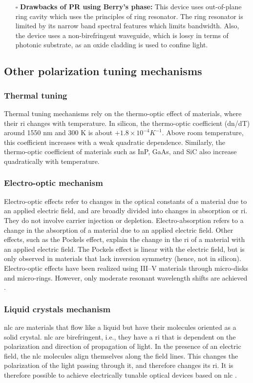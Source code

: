 \documentclass[../report.tex]{subfiles}
\begin{document}
\begin{itemize}[leftmargin=*]
		\item[$\square$] \textbf{Drawbacks of PR using Berry's phase:}
		This device uses out-of-plane ring cavity which uses the principles of ring resonator. The ring resonator is limited by its narrow band spectral features which limits bandwidth. Also, the device uses a non-birefringent waveguide, which is lossy in terms of photonic substrate, as an oxide cladding is used to confine light. 	
	\end{itemize}
	
\subsection{Other polarization tuning mechanisms}

\subsubsection{Thermal tuning} Thermal tuning mechanisms rely on the thermo-optic effect of materials, where their \gls{ri} changes with temperature. In silicon, the thermo-optic coefficient (dn/dT) around 1550 nm and 300 K is about $+1.8 \times 10^{-4} K^{-1}$. Above room temperature, this coefficient increases with a weak quadratic dependence. Similarly, the thermo-optic coefficient of materials such as InP, GaAs, and SiC also increase quadratically with temperature.

\subsubsection{Electro-optic mechanism}
Electro-optic effects refer to changes in the optical constants of a material due to an applied electric field, and are broadly divided into changes in absorption or \gls{ri}. They do not involve carrier injection or depletion. Electro-absorption refers to a change in the absorption of a material due to an applied electric field. Other effects, such as the Pockels effect, explain the change in the \gls{ri} of a material with an applied electric field. The Pockels effect is linear with the electric field, but is only observed in materials that lack inversion symmetry (hence, not in silicon). Electro-optic effects have been realized using III–V materials through micro-disks and micro-rings. However, only moderate resonant wavelength shifts are achieved \cite{elfadel_3d_2016}. 

\subsubsection{Liquid crystals mechanism} \gls{nlc} are materials that flow like a liquid but have their molecules oriented as a solid crystal. \gls{nlc} are birefringent, i.e., they have a \gls{ri} that is dependent on the polarization and direction of propagation of light. In the presence of an electric field, the \gls{nlc} molecules align themselves along the field lines. This changes the polarization of the light passing through it, and therefore changes its \gls{ri}. It is therefore possible to achieve electrically tunable optical devices based on \gls{nlc} \cite{deCort_tlc_09}.
\end{document}
